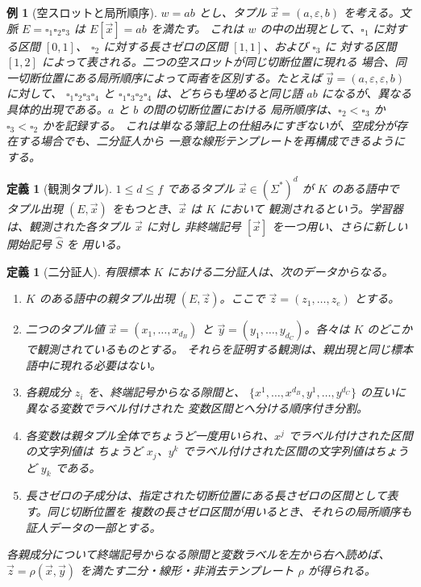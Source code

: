 \documentclass[11pt,a4paper]{ltjsarticle}
\newtheorem{definition}[theorem]{定義}
\newtheorem{example}[theorem]{例}
\theoremstyle{remark}
\newcommand{\tuple}[1]{\vec{#1}}
\newcommand{\blank}{\square}
\newcommand{\eps}{\varepsilon}
\begin{document}
\begin{example}[空スロットと局所順序]
\label{ex:empty-slots}
\(w=ab\) とし、タプル \(\tuple x=(a,\eps,b)\) を考える。文脈
\(E=\blank_1\blank_2\blank_3\) は \(E[\tuple x]=ab\) を満たす。
これは \(w\) の中の出現として、\(\blank_1\) に対する区間 \([0,1]\)、
\(\blank_2\) に対する長さゼロの区間 \([1,1]\)、および \(\blank_3\) に
対する区間 \([1,2]\) によって表される。二つの空スロットが同じ切断位置に現れる
場合、同一切断位置にある局所順序によって両者を区別する。たとえば
\(\tuple y=(a,\eps,\eps,b)\) に対して、
\(\blank_1\blank_2\blank_3\blank_4\) と
\(\blank_1\blank_3\blank_2\blank_4\) は、どちらも埋めると同じ語 \(ab\)
になるが、異なる具体的出現である。\(a\) と \(b\) の間の切断位置における
局所順序は、\(\blank_2<\blank_3\) か \(\blank_3<\blank_2\) かを記録する。
これは単なる簿記上の仕組みにすぎないが、空成分が存在する場合でも、二分証人から
一意な線形テンプレートを再構成できるようにする。
\end{example}

\begin{definition}[観測タプル]
\label{def:observed-tuple}
\(1\le d\le f\) であるタプル \(\tuple x\in(\Sigma^*)^d\) が \(K\) のある語中で
タプル出現 \((E,\tuple x)\) をもつとき、\(\tuple x\) は \(K\) において
\emph{観測される}という。学習器は、観測された各タプル \(\tuple x\) に対し
非終端記号 \([\tuple x]\) を一つ用い、さらに新しい開始記号 \(\widehat S\) を
用いる。
\end{definition}

\begin{definition}[二分証人]
\label{def:binary-witness}
有限標本 \(K\) における二分証人は、次のデータからなる。
\begin{enumerate}[label=(\roman*),leftmargin=*]
\item \(K\) のある語中の親タプル出現 \((E,\tuple z)\)。ここで
      \(\tuple z=(z_1,\ldots,z_e)\) とする。
\item 二つのタプル値
      \(\tuple x=(x_1,\ldots,x_{d_B})\) と
      \(\tuple y=(y_1,\ldots,y_{d_C})\)。各々は \(K\) のどこかで観測されているものとする。
      それらを証明する観測は、親出現と同じ標本語中に現れる必要はない。
\item 各親成分 \(z_i\) を、終端記号からなる隙間と、
      \(\{x^1,\ldots,x^{d_B},y^1,\ldots,y^{d_C}\}\) の互いに異なる変数でラベル付けされた
      変数区間とへ分ける順序付き分割。
\item 各変数は親タプル全体でちょうど一度用いられ、\(x^j\) でラベル付けされた区間の文字列値は
      ちょうど \(x_j\)、\(y^k\) でラベル付けされた区間の文字列値はちょうど \(y_k\) である。
\item 長さゼロの子成分は、指定された切断位置にある長さゼロの区間として表す。同じ切断位置を
      複数の長さゼロ区間が用いるとき、それらの局所順序も証人データの一部とする。
\end{enumerate}
各親成分について終端記号からなる隙間と変数ラベルを左から右へ読めば、
\(\tuple z=\rho(\tuple x,\tuple y)\) を満たす二分・線形・非消去テンプレート \(\rho\) が得られる。
\end{definition}
\end{document}
